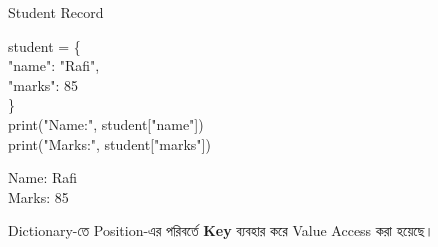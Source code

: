\begin{codeoutputbox}{Student Record}

\noindent
\begin{minipage}[t]{0.55\linewidth}
\codeheading

\begin{english}
\ttfamily
student = \{\\
\hspace*{4mm}"name": "Rafi",\\
\hspace*{4mm}"marks": 85\\
\}\\[0.5mm]
print("Name:", student["name"])\\
print("Marks:", student["marks"])
\end{english}

\end{minipage}
\hfill
\begin{minipage}[t]{0.41\linewidth}
\outputheading

\begin{english}
\ttfamily
Name: Rafi\\
Marks: 85
\end{english}

\medskip

Dictionary-তে Position-এর পরিবর্তে
\textbf{Key} ব্যবহার করে Value Access করা হয়েছে।

\end{minipage}

\end{codeoutputbox}



